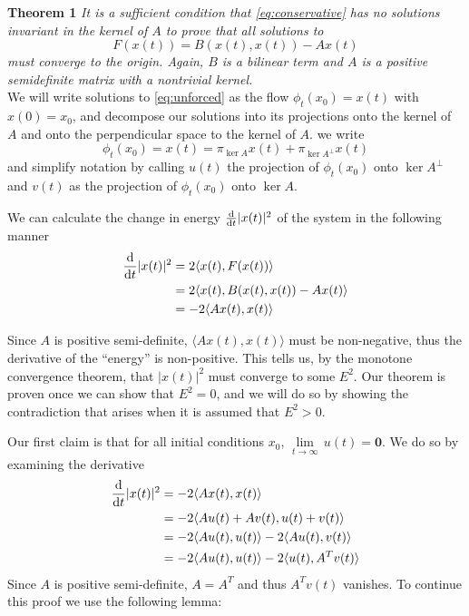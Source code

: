 \documentclass[11pt]{article}
\begin{document}
\textbf{Theorem 1} \textit{It is a sufficient condition that \eqref{eq:conservative} has no solutions invariant in the kernel of $A$ to prove that all solutions to}
\begin{equation*}
    F(x(t)) = B(x(t), x(t)) - Ax(t)
\end{equation*}
\textit{must converge to the origin. Again, $B$ is a bilinear term and $A$ is a positive semidefinite matrix with a nontrivial kernel. }\\

We will write solutions to \eqref{eq:unforced} as the flow $\phi_t(x_0) = x(t)$ with $x(0) = x_0$, and decompose our solutions into its projections onto the kernel of $A$ and onto the perpendicular space to the kernel of $A$. we write $$\phi_t(x_0) = x(t) = \pi_{\ker A}x(t) + \pi_{\ker A^{\perp}}x(t)$$ and simplify notation by calling $u(t)$ the projection of $\phi_t(x_0)$ onto $\ker A ^{\perp}$ and $v(t)$ as the projection of $\phi_t(x_0)$ onto $\ker A$.

We can calculate the change in energy $\dv{}{t}|x(t)|^2$ of the system in the following manner
\begin{align*}
    \dv{}{t}|x(t)|^2 & = 2\langle x(t), F(x(t))\rangle \\
    &= 2\langle x(t), B(x(t), x(t)) - Ax(t)\rangle \\
    & = -2 \langle Ax(t), x(t) \rangle
\end{align*}

Since $A$ is positive semi-definite, $\langle Ax(t), x(t) \rangle$ must be non-negative, thus the derivative of the ``energy'' is non-positive. This tells us, by the monotone convergence theorem, that $|x(t)|^2$ must converge to some $E^2$. Our theorem is proven once we can show that $E^2 = 0$, and we will do so by showing the contradiction that arises when it is assumed that $E^2 > 0$.

Our first claim is that for all initial conditions $x_0$, $\underset{t \rightarrow \infty}{\lim}  \, u(t) = \mathbf{0}$. We do so by examining the derivative
\begin{align*}
    \dv{}{t}|x(t)|^2 & = -2\langle Ax(t), x(t) \rangle \\
    & = -2\langle Au(t) + Av(t), u(t) + v(t)\rangle \\
    & = -2\langle Au(t), u(t)\rangle - 2 \langle Au(t), v(t)\rangle \\
    & = -2\langle Au(t), u(t) \rangle - 2 \langle u(t), A^{T}v(t) \rangle 
\end{align*}
Since $A$ is positive semi-definite, $A = A^T$ and thus $A^Tv(t)$ vanishes. To continue this proof we use the following lemma:\\
\end{document}
